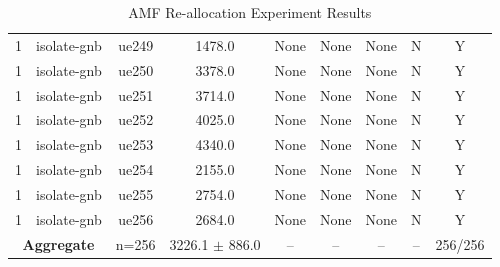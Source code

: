 \begin{table}[ht]
\begin{tabular}{|c|c|c|c|c|c|c|c|c|}
1 & isolate-gnb & ue249 & 1478.0 & None & None & None & N & Y \\
1 & isolate-gnb & ue250 & 3378.0 & None & None & None & N & Y \\
1 & isolate-gnb & ue251 & 3714.0 & None & None & None & N & Y \\
1 & isolate-gnb & ue252 & 4025.0 & None & None & None & N & Y \\
1 & isolate-gnb & ue253 & 4340.0 & None & None & None & N & Y \\
1 & isolate-gnb & ue254 & 2155.0 & None & None & None & N & Y \\
1 & isolate-gnb & ue255 & 2754.0 & None & None & None & N & Y \\
1 & isolate-gnb & ue256 & 2684.0 & None & None & None & N & Y \\
\multicolumn{2}{|c|}{\textbf{Aggregate}} & n=256 & 3226.1 $\pm$ 886.0 & -- & -- & -- & -- & 256/256 \\
\hline
\end{tabular}
\caption{AMF Re-allocation Experiment Results}
\label{tab:amf_realloc}
\end{table}
